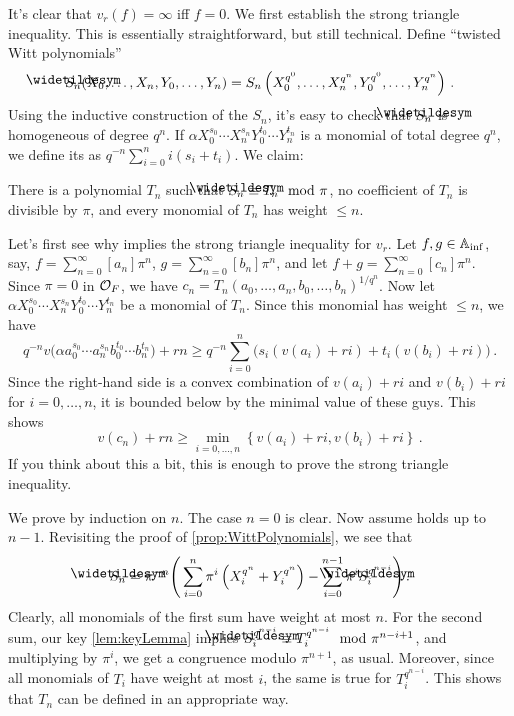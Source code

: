 \documentclass[a4paper, 10pt, oneside, DIV=9, chapterprefix=true, numbers=enddot,bibliography=totoc]{scrbook}
\begin{document}
\begin{proof*}
	It's clear that $v_r(f)=\infty$ iff $f=0$. We first establish the strong triangle inequality. This is essentially straightforward, but still technical. Define \enquote{twisted Witt polynomials}
	\begin{equation*}
		\snake{S}_n(X_0,\dotsc,X_n,Y_0,\dotsc,Y_n)=S_n\left(X_0^{q^0},\dotsc,X_n^{q^n},Y_0^{q^0},\dotsc,Y_n^{q^n}\right)\,.
	\end{equation*}
	Using the inductive construction of the $S_n$, it's easy to check that $\snake{S}_n$ is homogeneous of degree $q^n$. If $\alpha X_0^{s_0}\dotsm X_n^{s_n}Y_0^{t_0}\dotsm Y_n^{t_n}$ is a monomial of total degree $q^n$, we define its  as $q^{-n}\sum_{i=0}^ni(s_i+t_i)$. We claim:
	\begin{alphanumerate}
		\item[\itememph{*}] There is a polynomial $T_n$ such that $\snake{S}_n\equiv T_n\mod \pi$, no coefficient of $T_n$ is divisible by $\pi$, and every monomial of $T_n$ has weight $\leq n$.
	\end{alphanumerate}
	Let's first see why \itememph{*} implies the strong triangle inequality for $v_r$. Let $f,g\in \mathbb{A}_{\mathrm{inf}}$, say, $f=\sum_{n=0}^\infty [a_n]\pi^n$, $g=\sum_{n=0}^\infty [b_n]\pi^n$, and let $f+g=\sum_{n=0}^\infty[c_n]\pi^n$. Since $\pi=0$ in $\mathcal{O}_F$, we have $c_n=T_n(a_0,\dotsc,a_n,b_0,\dotsc,b_n)^{1/q^n}$. Now let $\alpha X_0^{s_0}\dotsm X_n^{s_n}Y_0^{t_0}\dotsm Y_n^{t_n}$ be a monomial of $T_n$. Since this monomial has weight $\leq n$, we have
	\begin{equation*}
		q^{-n}v\big(\alpha a_0^{s_0}\dotsm a_n^{s_n}b_0^{t_0}\dotsm b_n^{t_n}\big)+rn\geq q^{-n}\sum_{i=0}^n\big(s_i(v(a_i)+ri)+t_i(v(b_i)+ri)\big)\,.
	\end{equation*}
	Since the right-hand side is a convex combination of $v(a_i)+ri$ and $v(b_i)+ri$ for $i=0,\dotsc,n$, it is bounded below by the minimal value of these guys. This shows
	\begin{equation*}
		v(c_n)+rn\geq \min_{i=0,\dotsc,n}\left\{v(a_i)+ri,v(b_i)+ri\right\}\,.
	\end{equation*}
	If you think about this a bit, this is enough to prove the strong triangle inequality.
	
	We prove \itememph{*} by induction on $n$. The case $n=0$ is clear. Now assume \itememph{*} holds up to $n-1$. Revisiting the proof of \cref{prop:WittPolynomials}, we see that
	\begin{equation*}
		\snake{S}_n=\pi^{-n}\Bigg(\sum_{i=0}^n\pi^i\left(X_i^{q^n}+Y_i^{q^n}\right)-\sum_{i=0}^{n-1}\pi^i\snake{S}_i^{q^{n-i}}\Bigg)\,.
	\end{equation*}
	Clearly, all monomials of the first sum have weight at most $n$. For the second sum, our key \cref{lem:keyLemma} implies $\snake{S}_i^{q^{n-i}}\equiv T_i^{q^{n-i}}\mod\pi^{n-i+1}$, and multiplying by $\pi^i$, we get a congruence modulo $\pi^{n+1}$, as usual. Moreover, since all monomials of $T_i$ have weight at most $i$, the same is true for $T_i^{q^{n-i}}$. This shows that $T_n$ can be defined in an appropriate way.
	

\end{proof*}
\end{document}
